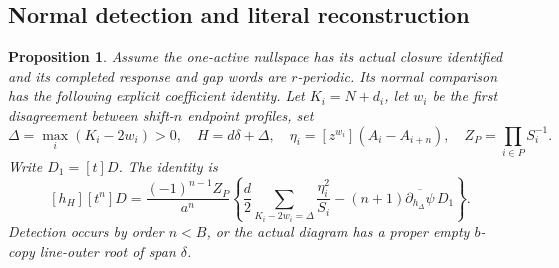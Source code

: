 \documentclass[11pt,a4paper]{amsart}
\numberwithin{equation}{section}
\theoremstyle{plain}
\newtheorem{proposition}[theorem]{Proposition}
\theoremstyle{definition}
\begin{document}
\subsection{Normal detection and literal reconstruction}

\begin{proposition}\label{prop:normal-interface}
Assume the one-active nullspace has its actual closure identified and its completed response and gap words are \(r\)-periodic.  Its normal comparison has the following explicit coefficient identity.  Let \(K_i=N+d_i\), let \(w_i\) be the first disagreement between shift-\(n\) endpoint profiles, set
\[
 \Delta=\max_i(K_i-2w_i)>0,\quad H=d\delta+\Delta,
 \quad\eta_i=[z^{w_i}](A_i-A_{i+n}),\quad Z_P=\prod_{i\in P}S_i^{-1}.
\]
Write \(D_1=[t]D\).  The identity is
\begin{equation}\label{eq:normal-interface}
 [h_H][t^n]D=\frac{(-1)^{n-1}Z_P}{a^n}
 \left\{\frac d2\sum_{K_i-2w_i=\Delta}\frac{\eta_i^2}{S_i}
 -(n+1)\overline{\partial_{h_\Delta}\psi}\,D_1\right\}.
\end{equation}
Detection occurs by order \(n<B\), or the actual diagram has a proper empty \(b\)-copy line-outer root of span \(\delta\).
\end{proposition}
\end{document}
